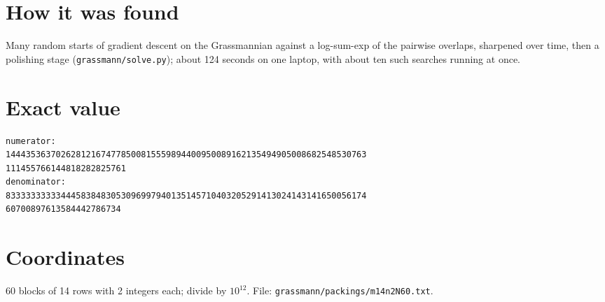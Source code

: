 \documentclass[11pt,a4paper]{article}
\begin{document}
\section{How it was found}
Many random starts of gradient descent on the Grassmannian against a log-sum-exp of the pairwise overlaps, sharpened over time, then a polishing stage (\texttt{grassmann/solve.py}); about 124 seconds on one laptop, with about ten such searches running at once.


\appendix
\section{Exact value}
{\small
\begin{verbatim}
numerator:
144435363702628121674778500815559894400950089162135494905008682548530763
111455766144818282825761
denominator:
833333333334445838483053096997940135145710403205291413024143141650056174
60700897613584442786734
\end{verbatim}}

\section{Coordinates}
60 blocks of 14 rows with 2 integers each; divide by $10^{12}$. File: \texttt{grassmann/packings/m14n2N60.txt}.
{\tiny
\begin{multicols}{4}
\end{multicols}}
\end{document}
